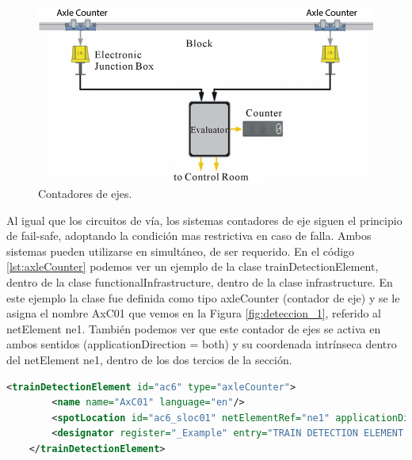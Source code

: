     \begin{figure}[!h]
        \centering
        \includegraphics[width=1\textwidth]{Figuras/contador.jpg}
        \centering\caption{Contadores de ejes.}
        \label{fig:deteccion_2}
    \end{figure}

    Al igual que los circuitos de vía, los sistemas contadores de eje siguen el principio de fail-safe, adoptando la condición mas restrictiva en caso de falla. Ambos sistemas pueden utilizarse en simultáneo, de ser requerido. En el código \ref{lst:axleCounter} podemos ver un ejemplo de la clase trainDetectionElement, dentro de la clase functionalInfrastructure, dentro de la clase infrastructure. En este ejemplo la clase fue definida como tipo axleCounter (contador de eje) y se le asigna el nombre AxC01 que vemos en la Figura \ref{fig:deteccion_1}, referido al netElement ne1. También podemos ver que este contador de ejes se activa en ambos sentidos (applicationDirection = both) y su coordenada intrínseca dentro del netElement ne1, dentro de los dos tercios de la sección.

    \begin{lstlisting}[language = XML, caption = Clase trainDetectionElement , label = {lst:axleCounter}]
    <trainDetectionElement id="ac6" type="axleCounter">
        <name name="AxC01" language="en"/>
        <spotLocation id="ac6_sloc01" netElementRef="ne1" applicationDirection="both" intrinsicCoord="0.6710"/>
        <designator register="_Example" entry="TRAIN DETECTION ELEMENT AxC01"/>
    </trainDetectionElement>
    \end{lstlisting}